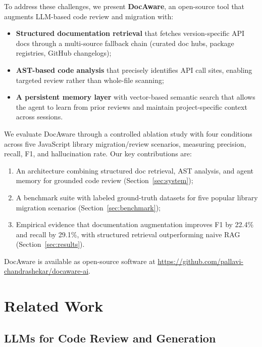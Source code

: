 \documentclass[sigconf,nonacm]{acmart}
\begin{document}
To address these challenges, we present \textbf{DocAware}, an open-source tool that augments LLM-based code review and migration with:
\begin{itemize}
    \item \textbf{Structured documentation retrieval} that fetches version-specific API docs through a multi-source fallback chain (curated doc hubs, package registries, GitHub changelogs);
    \item \textbf{AST-based code analysis} that precisely identifies API call sites, enabling targeted review rather than whole-file scanning;
    \item \textbf{A persistent memory layer} with vector-based semantic search that allows the agent to learn from prior reviews and maintain project-specific context across sessions.
\end{itemize}

We evaluate DocAware through a controlled ablation study with four conditions across five JavaScript library migration/review scenarios, measuring precision, recall, F1, and hallucination rate. Our key contributions are:

\begin{enumerate}
    \item An architecture combining structured doc retrieval, AST analysis, and agent memory for grounded code review (Section~\ref{sec:system});
    \item A benchmark suite with labeled ground-truth datasets for five popular library migration scenarios (Section~\ref{sec:benchmark});
    \item Empirical evidence that documentation augmentation improves F1 by 22.4\% and recall by 29.1\%, with structured retrieval outperforming naive RAG (Section~\ref{sec:results}).
\end{enumerate}

DocAware is available as open-source software at \url{https://github.com/pallavi-chandrashekar/docaware-ai}.

\section{Related Work}
\label{sec:related}

\subsection{LLMs for Code Review and Generation}
\end{document}
